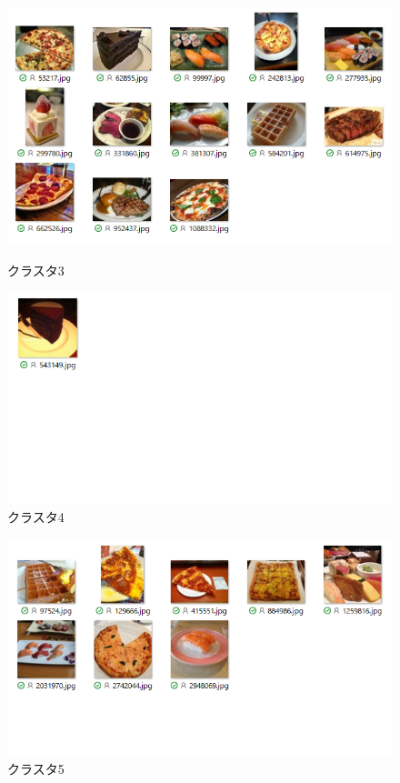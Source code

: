 \documentclass[dvipdfmx]{jsarticle}
\begin{document}
\begin{figure}[htbp]
  \begin{minipage}{0.5\hsize}
    \begin{center}
      \includegraphics[width=1.0\hsize]{./pic/ic3.png}
    \end{center}
    \caption{クラスタ3}
    \label{fig:ic3}
  \end{minipage}
  \begin{minipage}{0.5\hsize}
    \begin{center}
      \includegraphics[width=1.0\hsize]{./pic/ic4.png}
    \end{center}
    \caption{クラスタ4}
    \label{fig:ic4}
  \end{minipage}
\end{figure}
\begin{figure}[htbp]
  \centering
  \includegraphics[width=0.7\hsize]{./pic/ic5.png}
  \caption{クラスタ5}
  \label{fig:ic5}
\end{figure}
\end{document}
